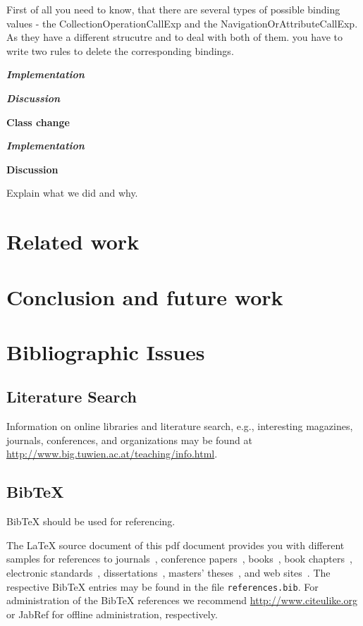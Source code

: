 \documentclass{llncs}
\begin{document}
First of all you need to know, that there are several types of possible binding values - the CollectionOperationCallExp and the NavigationOrAttributeCallExp.
As they have a different strucutre and to deal with both of them. you have to write two rules to delete the corresponding bindings.

\textbf\textit{{Implementation}}

\textbf\textit{{Discussion}}

\textbf{Class change}

\textbf\textit{{Implementation}}

\textbf{Discussion}

Explain what we did and why.

\section{Related work}

\section{Conclusion and future work}

\section{Bibliographic Issues}

\subsection{Literature Search}

Information on online libraries and literature search, e.g., interesting magazines, journals, conferences, and organizations may be found at \url{http://www.big.tuwien.ac.at/teaching/info.html}.

\subsection{BibTeX}

BibTeX should be used for referencing.

The LaTeX source document of this pdf document provides you with different samples for references to journals~\cite{jour:B2BServices}, conference papers~\cite{proc:TheWebMLApproach}, books~\cite{book:umlatwork}, book chapters~\cite{incoll:ErhardKonrad1992}, electronic standards~\cite{man:BPEL}, dissertations~\cite{phdthesis:manuelWimmer}, masters' theses~\cite{mast:AUMLProfile}, and web sites~\cite{misc:BIGWebsite}. The respective BibTeX entries may be found in the file \texttt{references.bib}. For administration of the BibTeX references we recommend \url{http://www.citeulike.org} or JabRef for offline administration, respectively.



\end{document}

